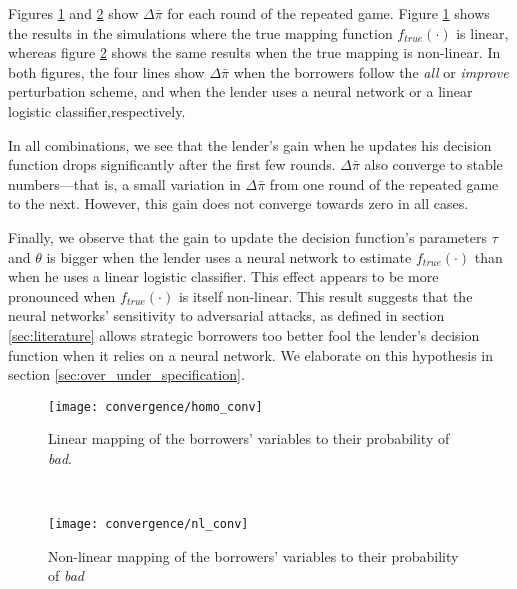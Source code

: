 \documentclass[12pt]{article} %
\begin{document}
Figures \ref{fig:conv_homo} and \ref{fig:conv_nl} show $\Delta \bar{\pi}$ for each round of the repeated game. Figure \ref{fig:conv_homo} shows the results in the simulations where the true mapping function $f_{true}(\cdot)$ is linear, whereas figure \ref{fig:conv_nl} shows the same results when the true mapping is non-linear. In both figures, the four lines show $\Delta \bar{\pi}$ when the borrowers follow the \textit{all} or \textit{improve} perturbation scheme, and when the lender uses a neural network or a linear logistic classifier,respectively. 

In all combinations, we see that the lender's gain when he updates his decision function drops significantly after the first few rounds. $\Delta \bar{\pi}$ also converge to stable numbers---that is, a small variation in $\Delta \bar{\pi}$ from one round of the repeated game to the next. However, this gain does not converge towards zero in all cases. 

Finally, we observe that the gain to update the decision function's parameters  $\tau$ and $\theta$ is bigger when the lender uses a neural network to estimate $f_{true}(\cdot)$ than when he uses a linear logistic classifier. This effect appears to be more pronounced when $f_{true}(\cdot)$ is itself non-linear. This result suggests that the neural networks' sensitivity to adversarial attacks, as defined in section \ref{sec:literature} allows strategic borrowers too better fool the lender's decision function when it relies on a neural network. We elaborate on this hypothesis in section \ref{sec:over_under_specification}. 


\begin{figure*}[t!]
    \centering
    \begin{subfigure}{0.5\textwidth}
        \centering
        \texttt{[image: convergence/homo\_conv]}
        \caption{Linear mapping of the borrowers' variables to their probability of \textit{bad}.}
        \label{fig:conv_homo}
    \end{subfigure}%
    ~ 
    \begin{subfigure}{0.5\textwidth}
        \centering
        \texttt{[image: convergence/nl\_conv]}
            \caption{Non-linear mapping of the borrowers' variables to their probability of \textit{bad}}
        \label{fig:conv_nl}
    \end{subfigure}
    \caption{In the two figures show the convergence of the repeated game measured as profit gained by the lender if he adapted his decision profits at the end of a round, i.e. $\Delta \bar{\pi}$. Each line shows this convergence for a different level of sophistication of the lender (logistic classifier or neural network) and for a different perturbation scheme (\textit{all}, and \textit{improve}).
    }
\end{figure*}
\end{document}
